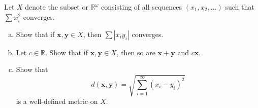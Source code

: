 \documentclass[10pt]{article}
\providecommand{\RR}{\mathbb R}
\providecommand{\ii}{\item}
\providecommand{\mb}[1]{\mathbf{#1}}
\providecommand{\abs}[1]{\left|#1\right|}
\begin{document}
\pagebreak

\begin{problem}
    [Munkres 20.10]
    Let $X$ denote the subset or $\RR^\omega$ consisting of
    all sequences $(x_1,x_2,\dots)$ such that $\sum x_i^2$ converges.
    \begin{enumerate}[(a)]
	\ii Show that if $\mb x,\mb y\in X$, then $\sum\abs{x_iy_i}$ converges.
	\ii Let $c\in\RR$. Show that if $\mb x,\mb y\in X$,
	then so are $\mb x+\mb y$ and $c\mb x$.
	\ii Show that
	\begin{equation*}
	    d(\mb x,\mb y) = \sqrt{\sum_{i=1}^\infty (x_i-y_i)^2}
	\end{equation*}
	is a well-defined metric on $X$.
\end{enumerate}
\end{problem}
\end{document}
